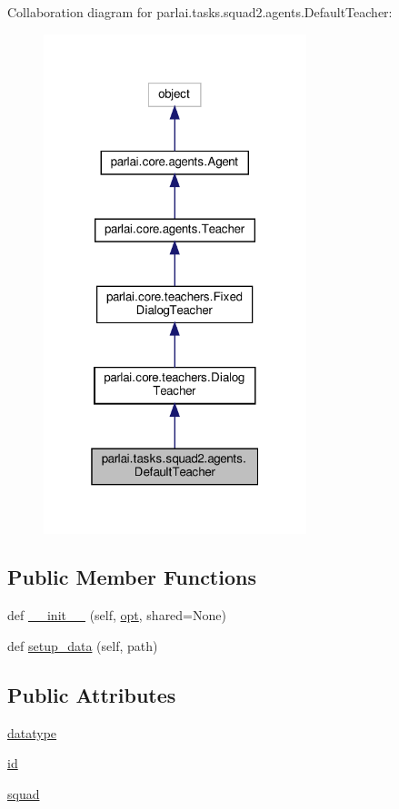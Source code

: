 Collaboration diagram for parlai.\+tasks.\+squad2.\+agents.\+Default\+Teacher\+:
\nopagebreak
\begin{figure}[H]
\begin{center}
\leavevmode
\includegraphics[width=217pt]{d9/db9/classparlai_1_1tasks_1_1squad2_1_1agents_1_1DefaultTeacher__coll__graph}
\end{center}
\end{figure}
\subsection*{Public Member Functions}
\begin{DoxyCompactItemize}
\item 
def \hyperlink{classparlai_1_1tasks_1_1squad2_1_1agents_1_1DefaultTeacher_aa97ab84de16c6d73501fef0c11bb1608}{\+\_\+\+\_\+init\+\_\+\+\_\+} (self, \hyperlink{classparlai_1_1core_1_1agents_1_1Teacher_a3ce6243860ce978a897922863ed32fa4}{opt}, shared=None)
\item 
def \hyperlink{classparlai_1_1tasks_1_1squad2_1_1agents_1_1DefaultTeacher_a68185506bbbcaadaee2dbf5162483437}{setup\+\_\+data} (self, path)
\end{DoxyCompactItemize}
\subsection*{Public Attributes}
\begin{DoxyCompactItemize}
\item 
\hyperlink{classparlai_1_1tasks_1_1squad2_1_1agents_1_1DefaultTeacher_a94222f3b61455346a81469cb340906a1}{datatype}
\item 
\hyperlink{classparlai_1_1tasks_1_1squad2_1_1agents_1_1DefaultTeacher_ac4998f160789f2d35c7ddc9c8b24792e}{id}
\item 
\hyperlink{classparlai_1_1tasks_1_1squad2_1_1agents_1_1DefaultTeacher_a69f44b45bdcb0f11323c45781c4b20a2}{squad}
\end{DoxyCompactItemize}
